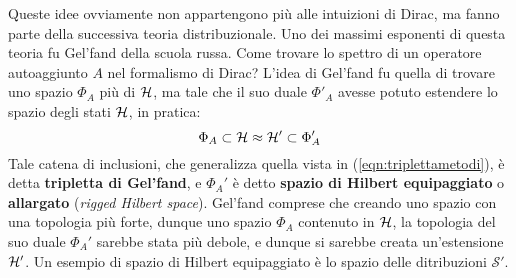\documentclass[../../FisicaTeorica.tex]{subfiles}
\begin{document}
Queste idee ovviamente non appartengono più alle intuizioni di Dirac, ma fanno parte della successiva teoria distribuzionale. Uno dei massimi esponenti di questa teoria fu Gel'fand della scuola russa. Come trovare lo spettro di un operatore autoaggiunto $A$ nel formalismo di Dirac? L'idea di Gel'fand fu quella di trovare uno spazio $\Phi_A$ più  di $\mathcal{H}$, ma tale che il suo duale $\Phi'_A$ avesse potuto estendere lo spazio degli stati $\mathcal{H}$, in pratica:
\begin{equation}
\Phi_A \subset \mathcal{H} \approx \mathcal{H}' \subset \Phi_A'
\label{tripletta-gelfand}
\end{equation}
Tale catena di inclusioni, che generalizza quella vista in (\ref{eqn:triplettametodi}), è detta \textbf{tripletta di Gel'fand}, e $\Phi_A'$ è detto \textbf{spazio di Hilbert equipaggiato} o \textbf{allargato} (\textit{rigged Hilbert space}). Gel'fand comprese che creando uno spazio con una topologia più forte, dunque uno spazio $\Phi_A$ contenuto in $\mathcal{H}$, la topologia del suo duale $\Phi_A'$ sarebbe stata più debole, e dunque si sarebbe creata un'estensione $\mathcal{H}'$. Un esempio di spazio di Hilbert equipaggiato è lo spazio delle ditribuzioni $\mathcal S'$.
\end{document}
